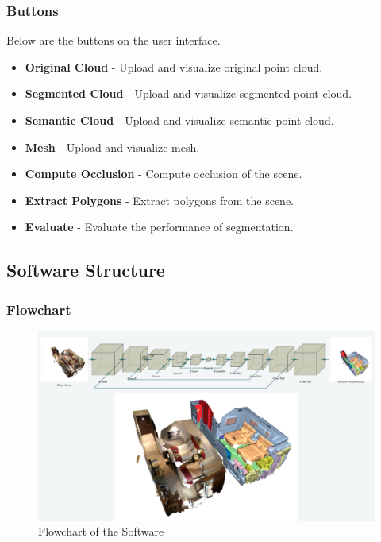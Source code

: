 \documentclass[11pt, a4paper,oneside,chapterprefix=false]{scrbook}
\begin{document}
\subsubsection{Buttons}

Below are the buttons on the user interface.

\begin{itemize}
	\item \textbf{Original Cloud} - Upload and visualize original point cloud.
	\item \textbf{Segmented Cloud} - Upload and visualize segmented point cloud.
	\item \textbf{Semantic Cloud} - Upload and visualize semantic point cloud.
	\item \textbf{Mesh} - Upload and visualize mesh.
	\item \textbf{Compute Occlusion} - Compute occlusion of the scene.
	\item \textbf{Extract Polygons} - Extract polygons from the scene.
	\item \textbf{Evaluate} - Evaluate the performance of segmentation.
\end{itemize}

\subsection{Software Structure}

\subsubsection{Flowchart}

\begin{minipage}{\textwidth}
	\begin{figure}[H]
		\centering
		\includegraphics*[width=1.0\textwidth]{figures/Minkowski Engine.png}
		\caption{Flowchart of the Software}
		\label{fig:flowchart}
	\end{figure}
\end{minipage}
\end{document}
